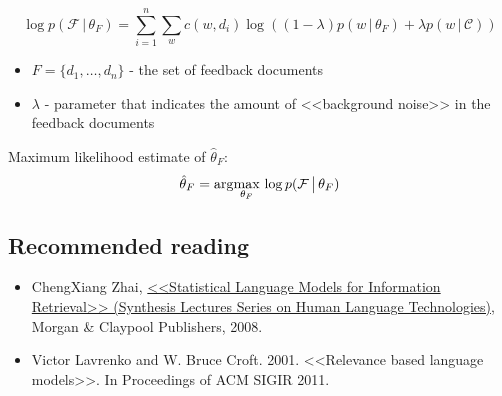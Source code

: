 \begin{equation*}
\log p(\mathcal{F} \,\big|\, \theta_F) = \sum_{i=1}^n \sum_w c(w, d_i) \log \left( (1-\lambda) p(w \,\big|\, \theta_F) + \lambda p(w \,\big|\, \mathcal{C}) \right)
\end{equation*}
\begin{itemize}
\item $F = \{d_1, \dots , d_n \}$ - the set of feedback documents
\item $\lambda$ - parameter that indicates the amount of <<background noise>> in the feedback documents
\end{itemize}

Maximum likelihood estimate of $\hat{\theta}_F$:
\begin{equation*}
\hat{\theta}_F = \arg\!\max_{\theta_F} \, \log p(\mathcal{F} \,\big|\, \theta_F)
\end{equation*}


\subsection{Recommended reading}
\begin{itemize}
\item ChengXiang Zhai, \href{http://www.morganclaypool.com/doi/abs/10.2200/S00158ED1V01Y200811HLT001}{<<Statistical Language Models for Information Retrieval>> (Synthesis Lectures Series on Human Language Technologies)}, Morgan \& Claypool Publishers, 2008.
\item Victor Lavrenko and W. Bruce Croft. 2001. <<Relevance based language models>>. In Proceedings of ACM SIGIR 2011. 
\end{itemize}

